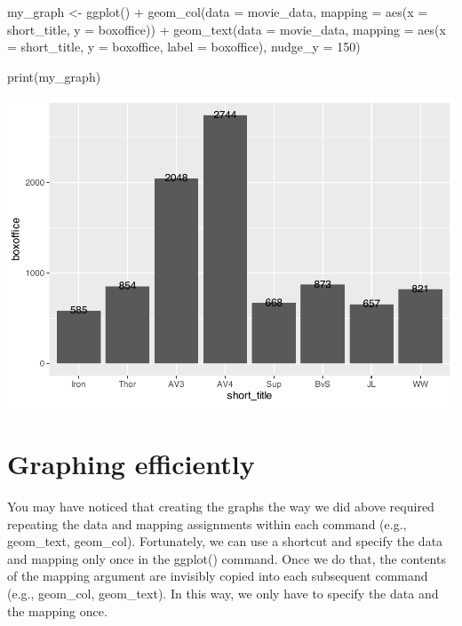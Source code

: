 \documentclass[
]{krantz}
\makeatletter
\newenvironment{Shaded}{\begin{snugshade}}{\end{snugshade}}
\newcommand{\AttributeTok}[1]{\textcolor[rgb]{0.61,0.61,0.61}{#1}}
\newcommand{\DecValTok}[1]{\textcolor[rgb]{0.06,0.06,0.06}{#1}}
\newcommand{\FunctionTok}[1]{\textcolor[rgb]{0,0,0}{#1}}
\newcommand{\NormalTok}[1]{#1}
\newcommand{\OtherTok}[1]{\textcolor[rgb]{0.37,0.37,0.37}{#1}}
\newcommand{\SpecialCharTok}[1]{\textcolor[rgb]{0,0,0}{#1}}
\newenvironment{kframe}{%
\medskip{}
\setlength{\fboxsep}{.8em}
 \def\at@end@of@kframe{}%
 \ifinner\ifhmode%
  \def\at@end@of@kframe{\end{minipage}}%
  \begin{minipage}{\columnwidth}%
 \fi\fi%
 \def\FrameCommand##1{\hskip\@totalleftmargin \hskip-\fboxsep
 \colorbox{shadecolor}{##1}\hskip-\fboxsep
     \hskip-\linewidth \hskip-\@totalleftmargin \hskip\columnwidth}%
 \MakeFramed {\advance\hsize-\width
   \@totalleftmargin\z@ \linewidth\hsize
   \@setminipage}}%
 {\par\unskip\endMakeFramed%
 \at@end@of@kframe}
\renewenvironment{Shaded}{\begin{kframe}}{\end{kframe}}
\makeatother
\begin{document}
\begin{Shaded}
\begin{Highlighting}[]
\NormalTok{my\_graph }\OtherTok{\textless{}{-}} \FunctionTok{ggplot}\NormalTok{() }\SpecialCharTok{+}
  \FunctionTok{geom\_col}\NormalTok{(}\AttributeTok{data =}\NormalTok{ movie\_data,}
           \AttributeTok{mapping =} \FunctionTok{aes}\NormalTok{(}\AttributeTok{x =}\NormalTok{ short\_title, }
                         \AttributeTok{y =}\NormalTok{ boxoffice)) }\SpecialCharTok{+}
  \FunctionTok{geom\_text}\NormalTok{(}\AttributeTok{data =}\NormalTok{ movie\_data, }
           \AttributeTok{mapping =} \FunctionTok{aes}\NormalTok{(}\AttributeTok{x =}\NormalTok{ short\_title, }
                         \AttributeTok{y =}\NormalTok{ boxoffice, }
                         \AttributeTok{label =}\NormalTok{ boxoffice),}
           \AttributeTok{nudge\_y =} \DecValTok{150}\NormalTok{)}

\FunctionTok{print}\NormalTok{(my\_graph)}
\end{Highlighting}
\end{Shaded}

\includegraphics[width=0.65\linewidth]{bookdown_files/figure-latex/unnamed-chunk-111-1}

\hypertarget{graphing-efficiently}{%
\section{Graphing efficiently}\label{graphing-efficiently}}

You may have noticed that creating the graphs the way we did above required repeating the data and mapping assignments within each command (e.g., geom\_text, geom\_col). Fortunately, we can use a shortcut and specify the data and mapping only once in the ggplot() command. Once we do that, the contents of the mapping argument are invisibly copied into each subsequent command (e.g., geom\_col, geom\_text). In this way, we only have to specify the data and the mapping once.
\end{document}
